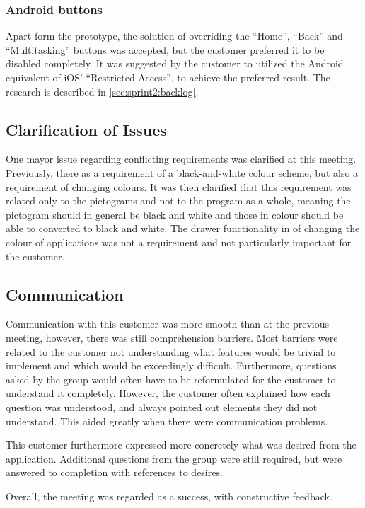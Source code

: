 \subsubsection{Android buttons}
Apart form the prototype, the solution of overriding the ``Home'', ``Back'' and ``Multitasking'' buttons was accepted, but the customer preferred it to be disabled completely.
It was suggested by the customer to utilized the Android equivalent of iOS' ``Restricted Access'', to achieve the preferred result.
The research is described in \cref{sec:sprint2:backlog}.

\subsection{Clarification of Issues}\label{sec:sprint2:clarification}
One mayor issue regarding conflicting requirements was clarified at this meeting.
Previously, there as a requirement of a black-and-white colour scheme, but also a requirement of changing colours.
It was then clarified that this requirement was related only to the pictograms and not to the program as a whole, meaning the pictogram should in general be black and white and those in colour should be able to converted to black and white.
The drawer functionality in \launcher of changing the colour of applications was not a requirement and not particularly important for the customer.

\subsection{Communication}
Communication with this customer was more smooth than at the previous meeting, however, there was still comprehension barriers.
Most barriers were related to the customer not understanding what features would be trivial to implement and which would be exceedingly difficult.
Furthermore, questions asked by the group would often have to be reformulated for the customer to understand it completely.
However, the customer often explained how each question was understood, and always pointed out elements they did not understand.
This aided greatly when there were communication problems.

This customer furthermore expressed more concretely what was desired from the application.
Additional questions from the group were still required, but were answered to completion with references to desires.

Overall, the meeting was regarded as a success, with constructive feedback.
